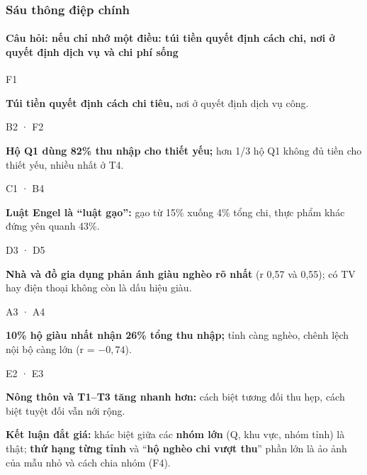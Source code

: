 \documentclass[aspectratio=169,10pt,t]{beamer}
\newcommand{\ask}[1]{{\color{ink2}Câu hỏi: #1}}
\begin{document}
\begin{frame}\frametitle{Sáu thông điệp chính}
\framesubtitle{\ask{nếu chỉ nhớ một điều: túi tiền quyết định cách chi, nơi ở quyết định dịch vụ và chi phí sống}}
\vspace{2pt}
\begin{tcbraster}[raster columns=3, raster equal height, raster column skip=7pt, raster row skip=7pt]
\begin{tcolorbox}[card, colback=tintF]{\scriptsize\medium\color{darkF} F1}\par{\bfseries Túi tiền quyết định cách chi tiêu,} nơi ở quyết định dịch vụ công.\end{tcolorbox}
\begin{tcolorbox}[card, colback=tintB]{\scriptsize\medium\color{darkB} B2 · F2}\par{\bfseries Hộ Q1 dùng 82\% thu nhập cho thiết yếu;} hơn 1/3 hộ Q1 không đủ tiền cho thiết yếu, nhiều nhất ở T4.\end{tcolorbox}
\begin{tcolorbox}[card, colback=tintC]{\scriptsize\medium\color{darkC} C1 · B4}\par{\bfseries Luật Engel là “luật gạo”:} gạo từ 15\% xuống 4\% tổng chi, thực phẩm khác đứng yên quanh 43\%.\end{tcolorbox}
\begin{tcolorbox}[card, colback=tintD]{\scriptsize\medium\color{darkD} D3 · D5}\par{\bfseries Nhà và đồ gia dụng phản ánh giàu nghèo rõ nhất} (r 0,57 và 0,55); có TV hay điện thoại không còn là dấu hiệu giàu.\end{tcolorbox}
\begin{tcolorbox}[card, colback=tintA]{\scriptsize\medium\color{darkA} A3 · A4}\par{\bfseries 10\% hộ giàu nhất nhận 26\% tổng thu nhập;} tỉnh càng nghèo, chênh lệch nội bộ càng lớn (r = $-0{,}74$).\end{tcolorbox}
\begin{tcolorbox}[card, colback=tintE]{\scriptsize\medium\color{darkE} E2 · E3}\par{\bfseries Nông thôn và T1–T3 tăng nhanh hơn:} cách biệt tương đối thu hẹp, cách biệt tuyệt đối vẫn nới rộng.\end{tcolorbox}
\end{tcbraster}
\vspace{5pt}
\begin{tcolorbox}[card, colback=goldsoftx, fontupper=\small\color{ink}]
{\bfseries\color{darkD} Kết luận đắt giá:} khác biệt giữa các \textbf{nhóm lớn} (Q, khu vực, nhóm tỉnh) là thật; \textbf{thứ hạng từng tỉnh} và “\textbf{hộ nghèo chi vượt thu}” phần lớn là ảo ảnh của mẫu nhỏ và cách chia nhóm (F4).
\end{tcolorbox}
\end{frame}
\end{document}
